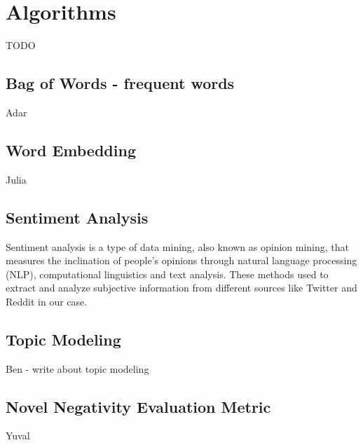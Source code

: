\section{Algorithms}
TODO


\subsection{Bag of Words - frequent words}
Adar

\subsection{Word Embedding}
Julia

\subsection{Sentiment Analysis}
Sentiment analysis is a type of data mining, also known as opinion mining, 
that measures the inclination of people’s opinions through natural language processing (NLP), computational linguistics and text analysis. These methods used to extract and analyze subjective information from different sources like Twitter and Reddit in our case.

\subsection{Topic Modeling}
Ben - write about topic modeling

\subsection{Novel Negativity Evaluation Metric}
Yuval 